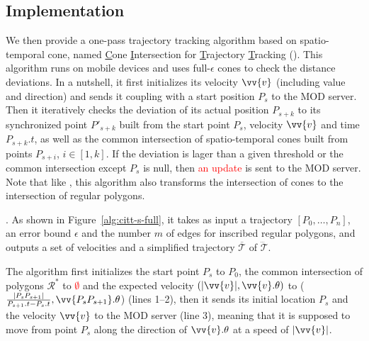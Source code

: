 \subsection{Implementation}
We then provide a one-pass trajectory tracking algorithm based on spatio-temporal cone, named \underline{C}one \underline{I}ntersection for \underline{T}rajectory \underline{T}racking (\citt). This algorithm runs on mobile devices and uses full-$\epsilon$ cones to check the distance deviations. In a nutshell, it first initializes its velocity $\vv{v}$ (including value and direction) and sends it coupling with a start position $P_s$ to the MOD server. Then it iteratively checks the deviation of its actual position $P_{s+k}$ to its synchronized point $P'_{s+k}$ built from the start point $P_s$, velocity $\vv{v}$ and time $P_{s+k}.t$, as well as the common intersection of spatio-temporal cones built from points $P_{s+i}$, $i \in [1, k]$. If the deviation is lager than a given threshold or the common intersection except $P_s$ is null, then \textcolor{red}{an update} is sent to the MOD server. Note that like \cised, this algorithm also transforms the intersection of cones to the intersection of regular polygons.


.
As shown in Figure~\ref{alg:citt-s-full}, it takes as input a trajectory ${[P_0, \ldots, P_n]}$, an error bound $\epsilon$ and the number $m$ of edges for inscribed regular polygons, and outputs a set of velocities and a simplified  trajectory $\overline{\mathcal{T}}$ of $\dddot{\mathcal{T}}$.

The algorithm first initializes the start point $P_s$ to $P_0$, the common intersection of polygons $\mathcal{R}^*$ to \textcolor{red}{$\emptyset$} and the expected velocity $(|\vv{v}|, \vv{v}.\theta)$ to ($\frac{|P_{s}P_{s+1}|}{P_{s+1}.t-P_s.t},\vv{P_{s}P_{s+1}}.\theta$) (lines 1--2), then it sends its initial location $P_s$ and the velocity $\vv{v}$ to the MOD server (line 3), meaning that it is supposed to move from point $P_s$ along the direction of $\vv{v}.\theta$ at a speed of $|\vv{v}|$.

